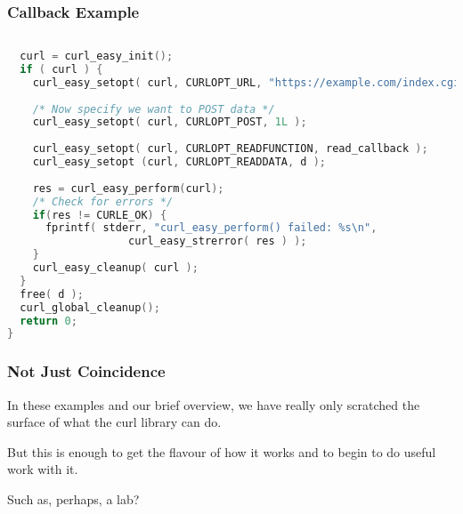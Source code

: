 \begin{frame}[fragile]
	\frametitle{Callback Example}
	\begin{lstlisting}[language=C]
 
  curl = curl_easy_init();
  if ( curl ) {
    curl_easy_setopt( curl, CURLOPT_URL, "https://example.com/index.cgi" );
 
    /* Now specify we want to POST data */ 
    curl_easy_setopt( curl, CURLOPT_POST, 1L );
 
    curl_easy_setopt( curl, CURLOPT_READFUNCTION, read_callback );
    curl_easy_setopt (curl, CURLOPT_READDATA, d );
 
    res = curl_easy_perform(curl);
    /* Check for errors */ 
    if(res != CURLE_OK) {
      fprintf( stderr, "curl_easy_perform() failed: %s\n",
                   curl_easy_strerror( res ) );
    }  
    curl_easy_cleanup( curl );
  }
  free( d );
  curl_global_cleanup();
  return 0;
}
\end{lstlisting}

\end{frame}



\begin{frame}
	\frametitle{Not Just Coincidence}

	In these examples and our brief overview, we have really only scratched the surface of what the curl library can do.

	But this is enough to get the flavour of how it works and to begin to do useful work with it.

	Such as, perhaps, a lab?


\end{frame}




